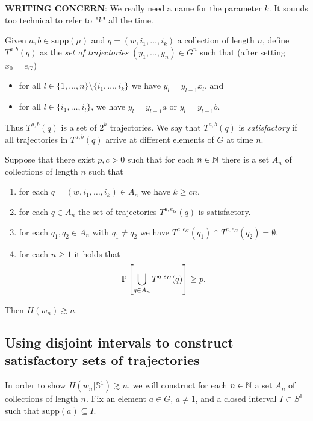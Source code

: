 \textbf{WRITING CONCERN}: We really need a name for the parameter $k$. It sounds too technical to refer to "$k$" all the time.

Given $a,b \in \mathrm{supp}(\mu)$ and $q = (w, i_1, \ldots, i_k)$ a collection of length $n$, define $T^{a,b}(q)$ as the \emph{set of trajectories} $(y_1, \ldots, y_n) \in G^n$ such that (after setting $x_0 = e_G$)
\begin{itemize}
    \item for all $l \in \{1,\ldots, n\} \setminus \{i_1,\ldots, i_k\}$ we have $y_l = y_{l-1}x_l$, and
    \item for all $l \in \{i_1, \ldots, i_l\}$, we have $y_l = y_{l-1} a$ or $y_l = y_{l-1} b$. 
\end{itemize} Thus $T^{a,b}(q)$ is a set of $2^k$ trajectories. We say that $T^{a,b}(q)$ is \emph{satisfactory} if all trajectories in $T^{a,b}(q)$ arrive at different elements of $G$ at time $n$.

\begin{thm} 
Suppose that there exist $p,c>0$ such that for each $n \in \N$ there is a set $A_n$ of collections of length $n$ such that
	\begin{enumerate}
		\item \label{item:entropy1} for each $q=(w,i_1,\ldots, i_k)\in A_n$ we have $k\ge cn$.
		\item \label{item:entropy3} for each $q\in A_n$ the set of trajectories $T^{a,e_G}(q)$ is satisfactory.
		\item \label{item:entropy4} for each $q_1,q_2\in A_n$ with $q_1\neq q_2$ we have $T^{a,e_G}(q_1)\cap T^{a,e_G}(q_2)= \emptyset$.
		\item \label{item:entropy5} for each $n\ge 1$ it holds that
		\[
		\P\left[ \bigcup_{q\in A_n}T^{a,e_G}(q)\right]\ge p.
		\]
	\end{enumerate}
	Then $H(w_n) \gtrsim n$.
\end{thm}

\subsection{Using disjoint intervals to construct satisfactory sets of trajectories}

In order to show $H(w_n|\mathbb{S}^1) \gtrsim n$, we will construct for
each $n\in\N$ a set $A_{n}$ of collections of length $n$.
Fix an element $a \in G$, $a \neq 1$, and a closed interval $I \subset S^1$ such that $\mathrm{supp}(a) \subseteq I$. 

